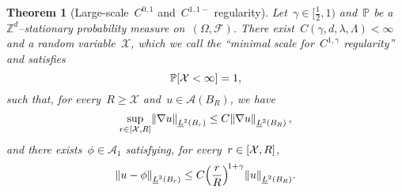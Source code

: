 \documentclass[11pt,twoside]{article} %
\numberwithin{equation}{section}
\newtheorem{theorem}{Theorem}[section]
\theoremstyle{definition}
\let\originalleft\left
\let\originalright\right
\renewcommand{\left}{\mathopen{}\mathclose\bgroup\originalleft}
\renewcommand{\right}{\aftergroup\egroup\originalright}
\newcommand*{\Zd}{\ensuremath{\mathbb{Z}^d}}
\newcommand{\F}{\mathcal{F}}
\renewcommand{\P}{\mathbb{P}}
\newcommand{\X}{\mathcal{X}}
\newcommand{\A}{\mathcal{A}}
\begin{document}
\begin{theorem}[Large-scale~$C^{0,1}$ and~$C^{1,1-}$ regularity]
\label{t.C11.sharp}
Let~$\gamma \in [\tfrac12,1)$ and~$\P$ be a~$\Zd$--stationary probability measure on~$(\Omega,\F)$. There exist~$C(\gamma,d,\lambda,\Lambda)<\infty$ and a random variable~$\X$, which we call the ``minimal scale for~$C^{1,\gamma}$ regularity'' and satisfies
\begin{equation}
\label{e.X.qual.sec2}
\P \left[ \X < \infty \right] = 1,
\end{equation}
such that, for every~$R\geq \X$ and~$u\in \A(B_R)$, we have 
\begin{equation}
\label{e.C01}
\sup_{r \in [\X,R]}
\left\| \nabla u \right\|_{\underline{L}^2(B_r)} 
\leq C \left\| \nabla u  \right\|_{\underline{L}^2(B_R)}
\,,
\end{equation}
and there exists~$\phi \in \A_1$ satisfying, for every~$r \in \left[ \X,  R \right]$, 
\begin{equation}
\label{e.intrinsicreg11-}
\left\| u - \phi \right\|_{\underline{L}^2(B_r)} \leq C \left( \frac r R \right)^{\!1+\gamma} 
\left\| u  \right\|_{\underline{L}^2(B_R)}.
\end{equation}
\end{theorem}
\end{document}
